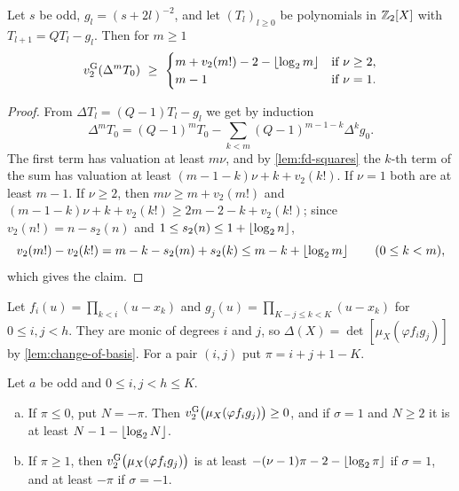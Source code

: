 \begin{lemma}\label{lem:fd-recursion}
Let $s$ be odd, $g_l=(s+2l)^{-2}$, and let $(T_l)_{l\ge0}$ be polynomials in $\mathbb{Z}_2[X]$ with
$T_{l+1}=QT_l-g_l$. Then for $m\ge1$
\[
  v_{2}^{\mathrm{G}}(\Delta^mT_0)\ \ge\
  \begin{cases}m+v_2(m!)-2-\left\lfloor \log_2m\right\rfloor&\text{if }\nu\ge2,\\ m-1&\text{if }\nu=1.\end{cases}
\]
\end{lemma}

\begin{proof}
From $\Delta T_l=(Q-1)T_l-g_l$ we get by induction
\[
  \Delta^mT_0=(Q-1)^mT_0-\sum_{k<m}(Q-1)^{m-1-k}\Delta^kg_0 .
\]
The first term has valuation at least $m\nu$, and by \cref{lem:fd-squares} the $k$-th term of
the sum has valuation at least $(m-1-k)\nu+k+v_2(k!)$. If $\nu=1$ both are at least $m-1$. If
$\nu\ge2$, then $m\nu\ge m+v_2(m!)$ and $(m-1-k)\nu+k+v_2(k!)\ge 2m-2-k+v_2(k!)$; since
$v_2(n!)=n-s_2(n)$ and $1\le s_2(n)\le1+\left\lfloor \log_2n\right\rfloor$,
\[
  v_2(m!)-v_2(k!)=m-k-s_2(m)+s_2(k)\le m-k+\left\lfloor \log_2m\right\rfloor\qquad(0\le k<m),
\]
which gives the claim.
\end{proof}

Let $f_i(u)=\prod_{k<i}(u-x_k)$ and $g_j(u)=\prod_{K-j\le k<K}(u-x_k)$ for $0\le i,j<h$. They
are monic of degrees $i$ and $j$, so $\Delta(X)=\det[\mu_X(\varphi f_ig_j)]$ by
\cref{lem:change-of-basis}. For a pair $(i,j)$ put $\pi=i+j+1-K$.

\begin{proposition}[entries]\label{prop:two-odd-entries}
Let $a$ be odd and $0\le i,j<h\le K$.
\begin{enumerate}[(a)]
\item If $\pi\le0$, put $N=-\pi$. Then $v_{2}^{\mathrm{G}}\bigl(\mu_X(\varphi f_ig_j)\bigr)\ge0$, and if
$\sigma=1$ and $N\ge2$ it is at least $N-1-\left\lfloor \log_2N\right\rfloor$.
\item If $\pi\ge1$, then $v_{2}^{\mathrm{G}}\bigl(\mu_X(\varphi f_ig_j)\bigr)$ is at least
$-(\nu-1)\pi-2-\left\lfloor \log_2\pi\right\rfloor$ if $\sigma=1$, and at least $-\pi$ if $\sigma=-1$.
\end{enumerate}
\end{proposition}

